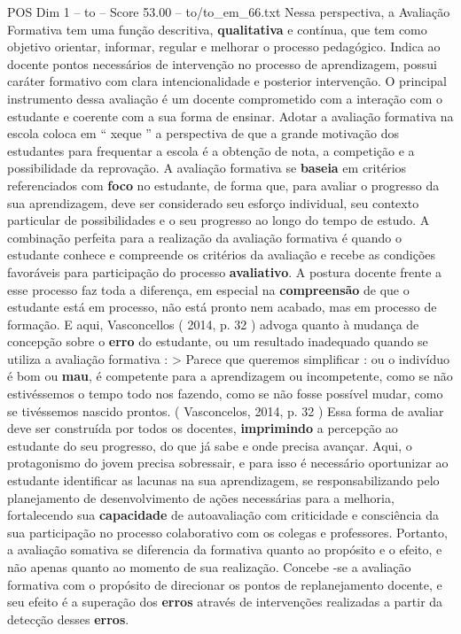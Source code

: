 \begin{textsample}{POS Dim 1 – to – Score 53.00 – to/to\_em\_66.txt}
Nessa perspectiva, a Avaliação Formativa tem uma função descritiva, \textbf{qualitativa} e contínua, que tem como objetivo orientar, informar, regular e melhorar o processo pedagógico.
Indica ao docente pontos necessários de intervenção no processo de aprendizagem, possui caráter formativo com clara intencionalidade e posterior intervenção.
O principal instrumento dessa avaliação é um docente comprometido com a interação com o estudante e coerente com a sua forma de ensinar.
Adotar a avaliação formativa na escola coloca em “ xeque ” a perspectiva de que a grande motivação dos estudantes para frequentar a escola é a obtenção de nota, a competição e a possibilidade da reprovação.
A avaliação formativa se \textbf{baseia} em critérios referenciados com \textbf{foco} no estudante, de forma que, para avaliar o progresso da sua aprendizagem, deve ser considerado seu esforço individual, seu contexto particular de possibilidades e o seu progresso ao longo do tempo de estudo.
A combinação perfeita para a realização da avaliação formativa é quando o estudante conhece e compreende os critérios da avaliação e recebe as condições favoráveis para participação do processo \textbf{avaliativo}.
A postura docente frente a esse processo faz toda a diferença, em especial na \textbf{compreensão} de que o estudante está em processo, não está pronto nem acabado, mas em processo de formação.
E aqui, Vasconcellos ( 2014, p. 32 ) advoga quanto à mudança de concepção sobre o \textbf{erro} do estudante, ou um resultado inadequado quando se utiliza a avaliação formativa : > Parece que queremos simplificar : ou o indivíduo é bom ou \textbf{mau}, é competente para a aprendizagem ou incompetente, como se não estivéssemos o tempo todo nos fazendo, como se não fosse possível mudar, como se tivéssemos nascido prontos. ( Vasconcelos, 2014, p. 32 ) Essa forma de avaliar deve ser construída por todos os docentes, \textbf{imprimindo} a percepção ao estudante do seu progresso, do que já sabe e onde precisa avançar.
Aqui, o protagonismo do jovem precisa sobressair, e para isso é necessário oportunizar ao estudante identificar as lacunas na sua aprendizagem, se responsabilizando pelo planejamento de desenvolvimento de ações necessárias para a melhoria, fortalecendo sua \textbf{capacidade} de autoavaliação com criticidade e consciência da sua participação no processo colaborativo com os colegas e professores.
Portanto, a avaliação somativa se diferencia da formativa quanto ao propósito e o efeito, e não apenas quanto ao momento de sua realização.
Concebe -se a avaliação formativa com o propósito de direcionar os pontos de replanejamento docente, e seu efeito é a superação dos \textbf{erros} através de intervenções realizadas a partir da detecção desses \textbf{erros}.

\end{textsample}
